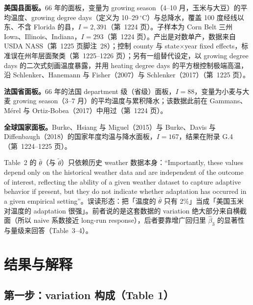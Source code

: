 \textbf{美国县面板。}66 年的面板，变量为 growing season（4--10 月，玉米与大豆）的平均温度、growing degree days（定义为 10--29\,$^\circ$C）与总降水，覆盖 100 度经线以东、不含 Florida 的县，$I=2{,}391$（第~1224 页）。子样本为 Corn Belt 三州 Iowa、Illinois、Indiana，$I=293$（第~1224 页）。产出是对数单产，数据来自 USDA NASS（第~1225 页脚注~28）；控制 county 与 state$\times$year fixed effects，标准误在州年层面聚类（第~1225--1226 页）；另有一组替代设定，以 growing degree days 的二次式刻画温度暴露，并用 heating degree days 的平方根控制极端高温，沿 Schlenker、Hanemann 与 Fisher（2007）与 Schlenker（2017）（第~1225 页）。

\textbf{法国省面板。}66 年的法国 department 级（省级）面板，$I=88$，变量为小麦与大麦 growing season（3--7 月）的平均温度与累积降水；该数据此前在 Gammans、Mérel 与 Ortiz-Bobea（2017）中用过（第~1224 页）。

\textbf{全球国家面板。}Burke、Hsiang 与 Miguel（2015）与 Burke、Davis 与 Diffenbaugh（2018）的国家年度均温与降水面板，$I=167$，结果在附录 G.4（第~1224--1225 页）。

\begin{pitfall}
Table~2 的 $\bar\theta$（与 $\tilde\theta$）只依赖历史 weather 数据本身：``Importantly, these values depend only on the historical weather data and are independent of the outcome of interest, reflecting the ability of a given weather dataset to capture adaptive behavior if present, but they do not indicate whether adaptation has occurred in a given empirical setting''\citep[第~1225 页]{merel2021climate}。误读形态：把「温度的 $\bar\theta$ 只有 2\%」当成「美国玉米对温度的 adaptation 很强」。前者说的是这套数据的 variation 绝大部分来自横截面（所以 naive 系数接近 long-run response），后者要靠增广回归里 $\widehat{\beta}_3$ 的显著性与量级来回答（Table~3--4）。
\end{pitfall}

\section{结果与解释}

\subsection{第一步：variation 构成（Table 1）}


